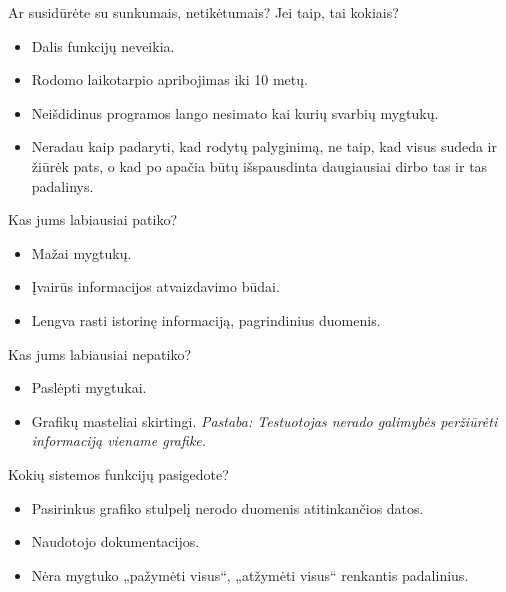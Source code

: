 Ar susidūrėte su sunkumais, netikėtumais? Jei taip, tai kokiais?
\begin{itemize}
  \item Dalis funkcijų neveikia.
  \item Rodomo laikotarpio apribojimas iki 10 metų.
  \item Neišdidinus programos lango nesimato kai kurių svarbių mygtukų.
  \item Neradau kaip padaryti, kad rodytų palyginimą, ne taip, kad visus
    sudeda ir žiūrėk pats, o kad po apačia būtų išspausdinta daugiausiai
    dirbo tas ir tas padalinys.
\end{itemize}

Kas jums labiausiai patiko?
\begin{itemize}
  \item Mažai mygtukų.
  \item Įvairūs informacijos atvaizdavimo būdai.
  \item Lengva rasti istorinę informaciją, pagrindinius duomenis.
\end{itemize}

Kas jums labiausiai nepatiko?
\begin{itemize}
  \item Paslėpti mygtukai.
  \item Grafikų masteliai skirtingi. \emph{Pastaba: Testuotojas
    nerado galimybės peržiūrėti informaciją viename grafike.}
\end{itemize}

Kokių sistemos funkcijų pasigedote?
\begin{itemize}
  \item Pasirinkus grafiko stulpelį nerodo duomenis atitinkančios datos.
  \item Naudotojo dokumentacijos.
  \item Nėra mygtuko „pažymėti visus“, „atžymėti visus“ renkantis
    padalinius.
\end{itemize}
